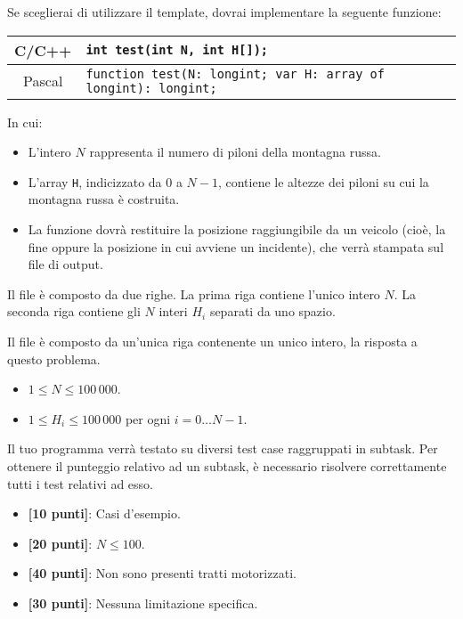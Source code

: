 Se sceglierai di utilizzare il template, dovrai implementare la seguente funzione:
\begin{center}\begin{tabularx}{\textwidth}{|c|X|}
\hline
C/C++  & \verb|int test(int N, int H[]);|\\
\hline
Pascal & \verb|function test(N: longint; var H: array of longint): longint;|\\
\hline
\end{tabularx}\end{center}
\pagebreak
In cui:
\begin{itemize}[nolistsep]
  \item L'intero $N$ rappresenta il numero di piloni della montagna russa.
  \item L'array \texttt{H}, indicizzato da $0$ a $N-1$, contiene le altezze dei piloni su cui la montagna russa \`e costruita.
  \item La funzione dovrà restituire la posizione raggiungibile da un veicolo (cio\`e, la fine oppure la posizione in cui avviene un incidente), che verrà stampata sul file di output.
\end{itemize}

\InputFile
Il file  è composto da due righe. La prima riga contiene l'unico intero $N$. La seconda riga contiene gli $N$ interi $H_i$ separati da uno spazio.

\OutputFile
Il file \outputfile{} è composto da un'unica riga contenente un unico intero, la risposta a questo problema.

\Constraints
\begin{itemize}[nolistsep, itemsep=2mm]
	\item $1 \le N \le 100\,000$.
	\item $1 \le H_i \le 100\,000$ per ogni $i=0\ldots N-1$.
\end{itemize}

\Scoring
Il tuo programma verrà testato su diversi test case raggruppati in subtask.
Per ottenere il punteggio relativo ad un subtask, è necessario risolvere
correttamente tutti i test relativi ad esso.

\begin{itemize}[nolistsep,itemsep=2mm]
  \item \textbf{ [10 punti]}: Casi d'esempio.
  \item \textbf{ [20 punti]}: $N \leq 100$.
  \item \textbf{ [40 punti]}: Non sono presenti tratti motorizzati.
  \item \textbf{ [30 punti]}: Nessuna limitazione specifica.
\end{itemize}

